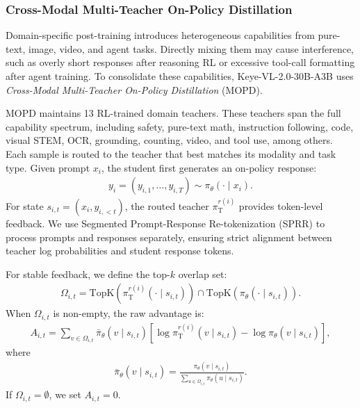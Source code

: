 \documentclass{llmxive}
\begin{document}
\subsubsection{Cross-Modal Multi-Teacher On-Policy Distillation}
\label{sec:mopd}

Domain-specific post-training introduces heterogeneous capabilities from pure-text, image, video, and agent tasks. Directly mixing them may cause interference, such as overly short responses after reasoning RL or excessive tool-call formatting after agent training. To consolidate these capabilities, Keye-VL-2.0-30B-A3B uses \emph{Cross-Modal Multi-Teacher On-Policy Distillation} (MOPD).

MOPD maintains 13 RL-trained domain teachers. These teachers span the full capability spectrum, including safety, pure-text math, instruction following, code, visual STEM, OCR, grounding, counting, video, and tool use, among others. Each sample is routed to the teacher that best matches its modality and task type. Given prompt $x_i$, the student first generates an on-policy response:
\begin{align}
    y_i=(y_{i,1},\ldots,y_{i,T}) \sim \pi_\theta(\cdot \mid x_i).
\end{align}
For state $s_{i,t}=(x_i,y_{i,<t})$, the routed teacher $\pi_{\mathrm{T}}^{r(i)}$ provides token-level feedback. We use Segmented Prompt-Response Re-tokenization (SPRR) to process prompts and responses separately, ensuring strict alignment between teacher log probabilities and student response tokens.

For stable feedback, we define the top-$k$ overlap set:
\begin{align}
    \Omega_{i,t}=
    \mathrm{TopK}\left(\pi_{\mathrm{T}}^{r(i)}(\cdot \mid s_{i,t})\right)
    \cap
    \mathrm{TopK}\left(\pi_{\theta}(\cdot \mid s_{i,t})\right).
\end{align}
When $\Omega_{i,t}$ is non-empty, the raw advantage is:
\begin{align}
    A_{i,t}=
    \sum_{v\in\Omega_{i,t}}
    \bar{\pi}_{\theta}(v\mid s_{i,t})
    \left[
    \log \pi_{\mathrm{T}}^{r(i)}(v\mid s_{i,t}) -
    \log \pi_{\theta}(v\mid s_{i,t})
    \right],
\end{align}
where
\begin{align}
    \bar{\pi}_{\theta}(v\mid s_{i,t})=
    \frac{\pi_{\theta}(v\mid s_{i,t})}
    {\sum_{u\in\Omega_{i,t}}\pi_{\theta}(u\mid s_{i,t})}.
\end{align}
If $\Omega_{i,t}=\emptyset$, we set $A_{i,t}=0$.
\end{document}
